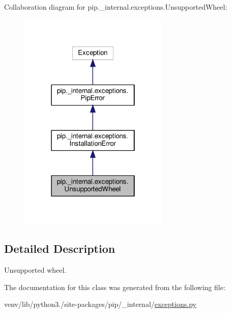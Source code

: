Collaboration diagram for pip.\+\_\+internal.\+exceptions.\+Unsupported\+Wheel\+:
\nopagebreak
\begin{figure}[H]
\begin{center}
\leavevmode
\includegraphics[width=202pt]{classpip_1_1__internal_1_1exceptions_1_1UnsupportedWheel__coll__graph}
\end{center}
\end{figure}


\subsection{Detailed Description}
\begin{DoxyVerb}Unsupported wheel.\end{DoxyVerb}
 

The documentation for this class was generated from the following file\+:\begin{DoxyCompactItemize}
\item 
venv/lib/python3./site-\/packages/pip/\+\_\+internal/\hyperlink{pip_2__internal_2exceptions_8py}{exceptions.\+py}\end{DoxyCompactItemize}
